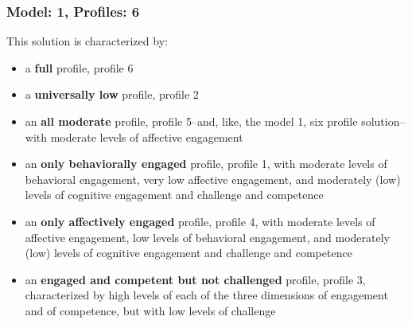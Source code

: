 \documentclass[]{book}
\providecommand{\tightlist}{%
  \setlength{\itemsep}{0pt}\setlength{\parskip}{0pt}}
\theoremstyle{definition}
\theoremstyle{definition}
\theoremstyle{definition}
\theoremstyle{remark}
\begin{document}
\subsubsection{Model: 1, Profiles: 6}\label{model-1-profiles-6}

This solution is characterized by:

\begin{itemize}
\tightlist
\item
  a \textbf{full} profile, profile 6
\item
  a \textbf{universally low} profile, profile 2
\item
  an \textbf{all moderate} profile, profile 5--and, like, the model 1,
  six profile solution--with moderate levels of affective engagement
\item
  an \textbf{only behaviorally engaged} profile, profile 1, with
  moderate levels of behavioral engagement, very low affective
  engagement, and moderately (low) levels of cognitive engagement and
  challenge and competence
\item
  an \textbf{only affectively engaged} profile, profile 4, with moderate
  levels of affective engagement, low levels of behavioral engagement,
  and moderately (low) levels of cognitive engagement and challenge and
  competence
\item
  an \textbf{engaged and competent but not challenged} profile, profile
  3, characterized by high levels of each of the three dimensions of
  engagement and of competence, but with low levels of challenge
\end{itemize}
\end{document}
